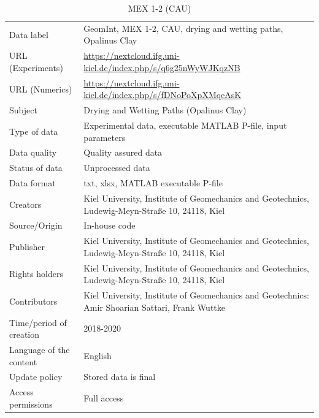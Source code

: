 \begin{table}[!ht]
\caption{MEX 1-2 (CAU)}
\label{tab:dms-mex1-2}
\small
\begin{tabular}{R{3.5cm}|L{7.5cm}}
\hline
%
Data label & GeomInt, MEX 1-2, CAU, drying and wetting paths, Opalinus Clay \\
URL (Experiments) & \url{https://nextcloud.ifg.uni-kiel.de/index.php/s/q6g25nWyWJKqzNB} \\
URL (Numerics) & \url{https://nextcloud.ifg.uni-kiel.de/index.php/s/fDNoPoXpXMqeAsK} \\
Subject  &  Drying and Wetting Paths (Opalinus Clay)\\
Type of data  & Experimental data, executable MATLAB P-file, input parameters\\
Data quality  &  Quality assured data \\
Status of data  &  Unprocessed data\\
Data format  & txt, xlsx, MATLAB executable P-file\\
Creators  &  Kiel University, Institute of Geomechanics and Geotechnics, Ludewig-Meyn-Stra\ss e 10, 24118, Kiel\\
Source/Origin & In-house code \\
Publisher  &  Kiel University, Institute of Geomechanics and Geotechnics, Ludewig-Meyn-Stra\ss e 10, 24118, Kiel \\
Rights holders &  Kiel University, Institute of Geomechanics and Geotechnics, Ludewig-Meyn-Stra\ss e 10, 24118, Kiel \\
Contributors &   Kiel University, Institute of Geomechanics and Geotechnics: Amir Shoarian Sattari, Frank Wuttke\\
Time/period of creation &  2018-2020\\
Language of the content &  English\\
Update policy &  Stored data is final\\
Access permissions & Full access\\
%
\hline
\end{tabular}
\end{table}